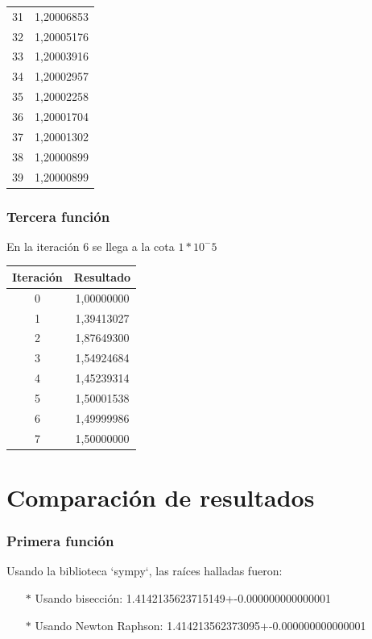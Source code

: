 \documentclass[titlepage,a4paper]{article}
\begin{document}
\begin{center}
\begin{tabular}{| c | c |}
        31    & 1,20006853 \\
        32    & 1,20005176 \\
        33    & 1,20003916 \\
        34    & 1,20002957 \\
        35    & 1,20002258 \\
        36    & 1,20001704 \\
        37    & 1,20001302 \\
        38    & 1,20000899 \\
        39    & 1,20000899 \\
    \hline
    \end{tabular}
\end{center}

\subsubsection{Tercera función}\label{sec:sec3}
En la iteración 6 se llega a la cota $1*10^-5$
\begin{center}
\begin{tabular}{| c | c |}
    \hline
     Iteración & Resultado \\ \hline
        0     & 1,00000000 \\
        1     & 1,39413027 \\
        2     & 1,87649300 \\
        3     & 1,54924684 \\
        4     & 1,45239314 \\
        5     & 1,50001538 \\
        6     & 1,49999986 \\
        7     & 1,50000000 \\
    \hline
    \end{tabular}
\end{center}

\section{Comparación de resultados}\label{sec:comparacion_resultados}
\subsubsection{Primera función}\label{sec:CR1}

Usando la biblioteca `sympy`, las raíces halladas fueron:
\begin{itemize}
    \item[$*$]Usando bisección:  1.4142135623715149+-0.000000000000001
    \item[$*$]Usando Newton Raphson:  1.414213562373095+-0.000000000000001
\end{itemize}
\end{document}
